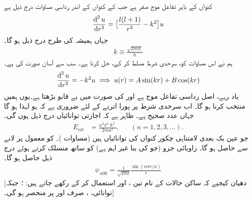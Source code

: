 \quad
کنواں کے باہر تفاعل موج صفر ہے جب کے کنواں کے اندر رداسی مساوات درج ذیل ہے
\begin{align}\label{مساوات_ابعادی_مربعی_کنواں_الف}
\frac{\dif^{\,2}u}{\dif r^{2}}=\big[\frac{l(l+1)}{r^{2}}-k^{2}\big]u 
\end{align}
جہاں ہمیشہ کی طرح درج ذیل ہو گا۔
\begin{align}
k\equiv\frac{\sqrt{2mE}}{\hslash} 
\end{align}
ہم نے اس مساوات کو، سرحدی شرط  مسلط کر کے، حل کرنا ہے۔ سب سے آسان صورت  کی ہے۔
\begin{align*}
\frac{\dif^{\,2}u}{\dif r^{2}}=-k^{2}u\implies {u(r)=A\sin(kr)+B\cos(kr)} 
\end{align*}
یاد رہے،  اصل رداسی تفاعل موج  ہے اور   کی صورت میں   بے قابو بڑھتا ہے۔یوں ہمیں  منتخب کرنا ہو گا۔ اب سرحدی شرط پر پورا اترنے کے لئے ضروری ہے  کہ  ہو لہٰذا
  ہو گا جہاں   عدد صحیح ہے۔ ظاہر ہے کہ اجازتی توانائیاں درج ذیل ہوں گی۔ 
\begin{align}
E_{n0}&=\frac{n^{2}\pi^{2}\hslash^{2}}{2ma^{2}},&&(n=1,2,3,...). 
\end{align}
جو عین یک بعدی لامتناہی چکور کنواں کی توانائیاں ہیں (مساوات )۔ 
کو معمول پر لانے سے  حاصل ہو گا۔ زاویائی جزو (جو 
کی بنا غیر اہم ہے) کو ساتھ منسلک کرتے ہوئے درج ذیل حاصل ہو گا۔ 
\begin{align}
\psi_{n00}=\frac{1}{\sqrt{2\pi a}}\frac{\sin(n\pi r/a)}{r} 
\end{align}
[دھیان کیجیے کہ ساکن حالات کے نام تین  ،  اور  استعمال کر کے رکھے جاتے ہیں: ؛ جبکہ توانائی، ،   صرف  اور  پر منحصر ہو گی۔] 

